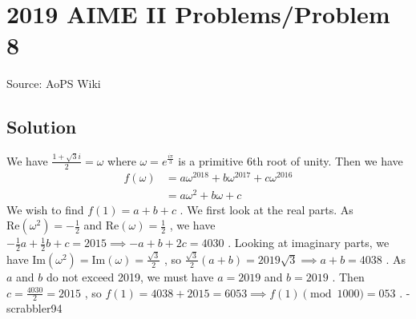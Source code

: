 \documentclass[12pt]{article}
\begin{document}
\section*{{2019 AIME II Problems/Problem 8}}
Source: AoPS Wiki

\subsection*{Solution}
We have $\frac{1+\sqrt{3}i}{2} = \omega$ where $\omega = e^{\frac{i\pi}{3}}$ is a primitive 6th root of unity. Then we have \begin{align*} f(\omega) &= a\omega^{2018} + b\omega^{2017} + c\omega^{2016}\\ &= a\omega^2 + b\omega + c \end{align*} We wish to find $f(1) = a+b+c$ . We first look at the real parts. As $\text{Re}(\omega^2) = -\frac{1}{2}$ and $\text{Re}(\omega) = \frac{1}{2}$ , we have $-\frac{1}{2}a + \frac{1}{2}b + c = 2015 \implies -a+b + 2c = 4030$ . Looking at imaginary parts, we have $\text{Im}(\omega^2) = \text{Im}(\omega) = \frac{\sqrt{3}}{2}$ , so $\frac{\sqrt{3}}{2}(a+b) = 2019\sqrt{3} \implies a+b = 4038$ . As $a$ and $b$ do not exceed 2019, we must have $a = 2019$ and $b = 2019$ . Then $c = \frac{4030}{2} = 2015$ , so $f(1) = 4038 + 2015 = 6053 \implies f(1) \pmod{1000} = \boxed{053}$ . -scrabbler94
\end{document}
